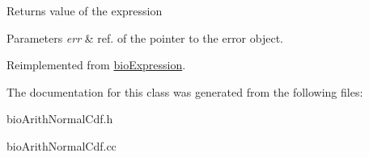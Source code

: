 \begin{DoxyReturn}{Returns}
value of the expression 
\end{DoxyReturn}

\begin{DoxyParams}{Parameters}
{\em err} & ref. of the pointer to the error object. \\
\hline
\end{DoxyParams}


Reimplemented from \hyperlink{classbio_expression_af58662a5d4d456f15bc4f2c9bd4f8a5b}{bio\+Expression}.



The documentation for this class was generated from the following files\+:\begin{DoxyCompactItemize}
\item 
bio\+Arith\+Normal\+Cdf.\+h\item 
bio\+Arith\+Normal\+Cdf.\+cc\end{DoxyCompactItemize}
